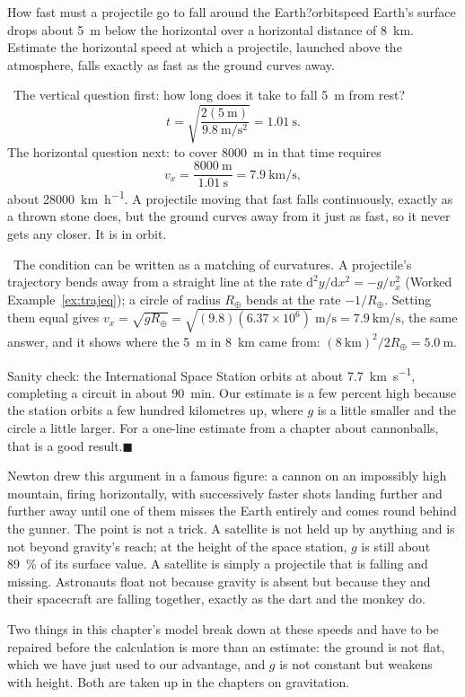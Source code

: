 \documentclass[11pt,twoside,openany]{book}
\newcommand{\dd}{\mathrm{d}}
\newcounter{check}[chapter]
\newcommand{\viewtag}[3]{\fcolorbox{#2}{#3}{\footnotesize\textbf{\textcolor{#2}{#1}}}}
\newcommand{\elemtag}{\viewtag{Elementary}{elemcol}{elempale}}
\newcommand{\calctag}{\viewtag{Calculus}{calccol}{calcpale}}
\newcommand{\elem}{\par\medskip\noindent\elemtag\ }
\newcommand{\calc}{\par\medskip\noindent\calctag\ }
\newcommand{\qed}{\hfill$\blacksquare$}
\begin{document}
\begin{example}{How fast must a projectile go to fall around the Earth?}{orbitspeed}
Earth's surface drops about \SI{5}{\metre} below the horizontal over a horizontal distance of \SI{8}{\kilo\metre}. Estimate the horizontal speed at which a projectile, launched above the atmosphere, falls exactly as fast as the ground curves away.

\elem The vertical question first: how long does it take to fall \SI{5}{\metre} from rest?
\[
t = \sqrt{\frac{2(\SI{5}{\metre})}{\SI{9.8}{\metre\per\second\squared}}} = \SI{1.01}{\second}.
\]
The horizontal question next: to cover \SI{8000}{\metre} in that time requires
\[
v_x = \frac{\SI{8000}{\metre}}{\SI{1.01}{\second}} = \SI{7.9}{\kilo\metre\per\second},
\]
about \SI{28000}{\kilo\metre\per\hour}. A projectile moving that fast falls continuously, exactly as a thrown stone does, but the ground curves away from it just as fast, so it never gets any closer. It is in orbit.

\calc The condition can be written as a matching of curvatures. A projectile's trajectory bends away from a straight line at the rate $\dd^2y/\dd x^2 = -g/v_x^2$ (Worked Example~\ref{ex:trajeq}); a circle of radius $R_\oplus$ bends at the rate $-1/R_\oplus$. Setting them equal gives $v_x = \sqrt{g R_\oplus} = \sqrt{(9.8)(6.37\times10^{6})}\ \si{\metre\per\second} = \SI{7.9}{\kilo\metre\per\second}$, the same answer, and it shows where the \SI{5}{\metre} in \SI{8}{\kilo\metre} came from: $ (\SI{8}{\kilo\metre})^2/2R_\oplus = \SI{5.0}{\metre}$.

Sanity check: the International Space Station orbits at about \SI{7.7}{\kilo\metre\per\second}, completing a circuit in about \SI{90}{\minute}. Our estimate is a few percent high because the station orbits a few hundred kilometres up, where $g$ is a little smaller and the circle a little larger. For a one-line estimate from a chapter about cannonballs, that is a good result.\qed
\end{example}

\begin{modelnote}
Newton drew this argument in a famous figure: a cannon on an impossibly high mountain, firing horizontally, with successively faster shots landing further and further away until one of them misses the Earth entirely and comes round behind the gunner. The point is not a trick. A satellite is not held up by anything and is not beyond gravity's reach; at the height of the space station, $g$ is still about \SI{89}{\percent} of its surface value. A satellite is simply a projectile that is falling and missing. Astronauts float not because gravity is absent but because they and their spacecraft are falling together, exactly as the dart and the monkey do.

Two things in this chapter's model break down at these speeds and have to be repaired before the calculation is more than an estimate: the ground is not flat, which we have just used to our advantage, and $g$ is not constant but weakens with height. Both are taken up in the chapters on gravitation.
\end{modelnote}
\end{document}
